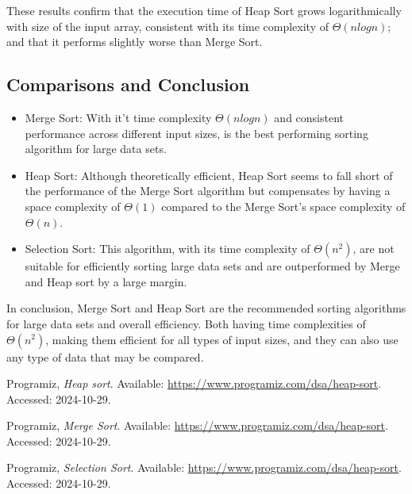 \documentclass[conference]{IEEEtran}
\begin{document}
These results confirm that the execution time of Heap Sort grows logarithmically with size of the input array, consistent with its time complexity of $\Theta(nlogn)$; and that it performs slightly worse than Merge Sort. 

\subsection{Comparisons and Conclusion}
\begin{itemize}
    \item Merge Sort: With it't time complexity $\Theta(nlogn)$ and consistent performance across different input sizes, is the best performing sorting algorithm for large data sets.
    \item Heap Sort: Although theoretically efficient, Heap Sort seems to fall short of the performance of the Merge Sort algorithm but compensates by having a space complexity of $\Theta(1)$ compared to the Merge Sort's space complexity of $\Theta(n)$.
    \item Selection Sort: This algorithm, with its time complexity of $\Theta(n^2)$, are not suitable for efficiently sorting large data sets and are outperformed by Merge and Heap sort by a large margin. 
\end{itemize}
In conclusion, Merge Sort and Heap Sort are the recommended sorting algorithms for large data sets and overall efficiency. Both having time complexities of $\Theta(n^2)$, making them efficient for all types of input sizes, and they can also use any type of data that may be compared. 

\begin{thebibliography}{1}

Programiz, \emph{Heap sort}. Available: \url{https://www.programiz.com/dsa/heap-sort}. Accessed: 2024-10-29.

Programiz, \emph{Merge Sort}. Available: \url{https://www.programiz.com/dsa/heap-sort}. Accessed: 2024-10-29.

Programiz, \emph{Selection Sort}. Available: \url{https://www.programiz.com/dsa/heap-sort}. Accessed: 2024-10-29.
\end{thebibliography}
\end{document}
